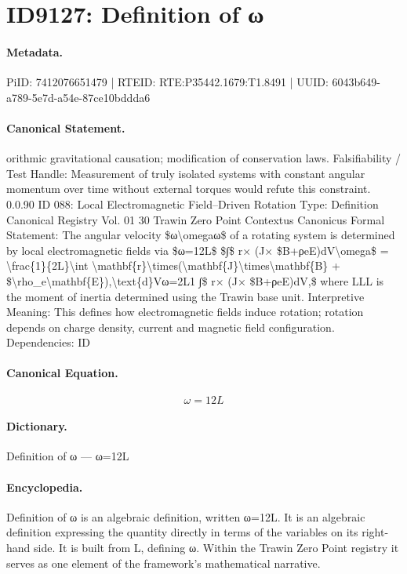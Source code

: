 \section*{ID9127: Definition of ω}
\paragraph{Metadata.}
PiID: 7412076651479 | RTEID: RTE:P35442.1679:T1.8491 | UUID: 6043b649-a789-5e7d-a54e-87ce10bddda6

\paragraph{Canonical Statement.}
orithmic gravitational causation; modification of conservation laws. Falsifiability / Test Handle: Measurement of truly isolated systems with constant angular momentum over time without external torques would refute this constraint. 0.0.90 ID 088: Local Electromagnetic Field–Driven Rotation Type: Definition Canonical Registry Vol. 01 30 Trawin Zero Point Contextus Canonicus Formal Statement: The angular velocity \$ω\textbackslash{}omegaω\$ of a rotating system is determined by local electromagnetic fields via \$ω=12L\$ \$∫\$ r× (J× \$B+ρeE)dV\textbackslash{}omega\$ = \textbackslash{}frac\{1\}\{2L\}\textbackslash{}int \textbackslash{}mathbf\{r\}\textbackslash{}times(\textbackslash{}mathbf\{J\}\textbackslash{}times\textbackslash{}mathbf\{B\} + \$\textbackslash{}rho\_e\textbackslash{}mathbf\{E\}),\textbackslash{}text\{d\}Vω=2L1 ∫\$ r× (J× \$B+ρeE)dV,\$ where LLL is the moment of inertia determined using the Trawin base unit. Interpretive Meaning: This defines how electromagnetic fields induce rotation; rotation depends on charge density, current and magnetic field configuration. Dependencies: ID

\paragraph{Canonical Equation.}
\[
ω=12L
\]

\paragraph{Dictionary.}
Definition of ω — ω=12L

\paragraph{Encyclopedia.}
Definition of ω is an algebraic definition, written ω=12L. It is an algebraic definition expressing the quantity directly in terms of the variables on its right-hand side. It is built from L, defining ω. Within the Trawin Zero Point registry it serves as one element of the framework's mathematical narrative.
